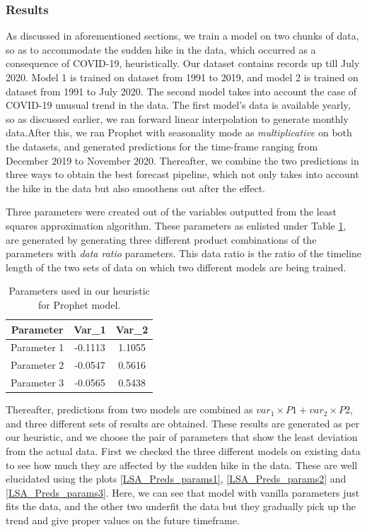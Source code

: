 \documentclass[10pt,journal,compsoc]{IEEEtran}
\begin{document}
\subsubsection{Results}
As discussed in aforementioned sections, we train a model on two chunks of data, so as to accommodate the sudden hike in the data, which occurred as a consequence of COVID-19, heuristically. Our dataset contains records up till July 2020. Model 1 is trained on dataset from 1991 to 2019, and model 2 is trained on dataset from 1991 to July 2020. The second model takes into account the case of COVID-19 unusual trend in the data. The first model's data is available yearly, so as discussed earlier, we ran forward linear interpolation to generate monthly data.After this, we ran Prophet with seasonality mode as \emph{multiplicative} on both the datasets, and generated predictions for the time-frame ranging from December 2019 to November 2020. Thereafter, we combine the two predictions in three ways to obtain the best forecast pipeline, which not only takes into account the hike in the data but also smoothens out after the effect.

Three parameters were created out of the variables outputted from the least squares approximation algorithm. These parameters as enlisted under Table \ref{params_table}, are generated by generating three different product combinations of the parameters with \emph{data ratio} parameters. This data ratio is the ratio of the timeline length of the two sets of data on which two different models are being trained. 

\begin{table}[!t]
\renewcommand{\arraystretch}{1.3}
\caption{Parameters used in our heuristic for Prophet model.}
\label{params_table}
\centering
\begin{tabular}{|c||c|c|}
\hline
\textbf{Parameter} & \textbf{Var\_1} & \textbf{Var\_2}\\
\hline
Parameter 1 & -0.1113 & 1.1055\\
Parameter 2 & -0.0547 & 0.5616\\
Parameter 3 & -0.0565 & 0.5438\\
\hline
\end{tabular}
\end{table}

Thereafter, predictions from two models are combined as \(var_1 \times P1 + var_2 \times P2\), and three different sets of results are obtained. These results are generated as per our heuristic, and we choose the pair of parameters that show the least deviation from the actual data. First we checked the three different models on existing data to see how much they are affected by the sudden hike in the data. These are well elucidated using the plots \ref{LSA_Preds_params1}, \ref{LSA_Preds_params2} and \ref{LSA_Preds_params3}. Here, we can see that model with vanilla parameters just fits the data, and the other two underfit the data but they gradually pick up the trend and give proper values on the future timeframe. 
\end{document}
